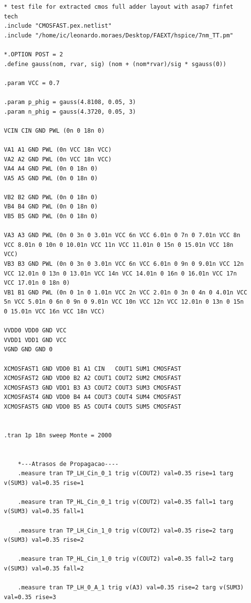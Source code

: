 \documentclass[ecp,tc, english]{iiufrgs}
\begin{document}
\begin{lstlisting}
* test file for extracted cmos full adder layout with asap7 finfet tech
.include "CMOSFAST.pex.netlist"
.include "/home/ic/leonardo.moraes/Desktop/FAEXT/hspice/7nm_TT.pm"

*.OPTION POST = 2
.define gauss(nom, rvar, sig) (nom + (nom*rvar)/sig * sgauss(0))

.param VCC = 0.7

.param p_phig = gauss(4.8108, 0.05, 3)
.param n_phig = gauss(4.3720, 0.05, 3)

VCIN CIN GND PWL (0n 0 18n 0)

VA1 A1 GND PWL (0n VCC 18n VCC)
VA2 A2 GND PWL (0n VCC 18n VCC)
VA4 A4 GND PWL (0n 0 18n 0)
VA5 A5 GND PWL (0n 0 18n 0)

VB2 B2 GND PWL (0n 0 18n 0)
VB4 B4 GND PWL (0n 0 18n 0)
VB5 B5 GND PWL (0n 0 18n 0)

VA3 A3 GND PWL (0n 0 3n 0 3.01n VCC 6n VCC 6.01n 0 7n 0 7.01n VCC 8n VCC 8.01n 0 10n 0 10.01n VCC 11n VCC 11.01n 0 15n 0 15.01n VCC 18n VCC)
VB3 B3 GND PWL (0n 0 3n 0 3.01n VCC 6n VCC 6.01n 0 9n 0 9.01n VCC 12n VCC 12.01n 0 13n 0 13.01n VCC 14n VCC 14.01n 0 16n 0 16.01n VCC 17n VCC 17.01n 0 18n 0)
VB1 B1 GND PWL (0n 0 1n 0 1.01n VCC 2n VCC 2.01n 0 3n 0 4n 0 4.01n VCC 5n VCC 5.01n 0 6n 0 9n 0 9.01n VCC 10n VCC 12n VCC 12.01n 0 13n 0 15n 0 15.01n VCC 16n VCC 18n VCC)

VVDD0 VDD0 GND VCC
VVDD1 VDD1 GND VCC
VGND GND GND 0

XCMOSFAST1 GND VDD0 B1 A1 CIN   COUT1 SUM1 CMOSFAST
XCMOSFAST2 GND VDD0 B2 A2 COUT1 COUT2 SUM2 CMOSFAST
XCMOSFAST3 GND VDD1 B3 A3 COUT2 COUT3 SUM3 CMOSFAST
XCMOSFAST4 GND VDD0 B4 A4 COUT3 COUT4 SUM4 CMOSFAST
XCMOSFAST5 GND VDD0 B5 A5 COUT4 COUT5 SUM5 CMOSFAST


.tran 1p 18n sweep Monte = 2000

    
    *---Atrasos de Propagacao----
    .measure tran TP_LH_Cin_0_1 trig v(COUT2) val=0.35 rise=1 targ v(SUM3) val=0.35 rise=1

    .measure tran TP_HL_Cin_0_1 trig v(COUT2) val=0.35 fall=1 targ v(SUM3) val=0.35 fall=1

    .measure tran TP_LH_Cin_1_0 trig v(COUT2) val=0.35 rise=2 targ v(SUM3) val=0.35 rise=2

    .measure tran TP_HL_Cin_1_0 trig v(COUT2) val=0.35 fall=2 targ v(SUM3) val=0.35 fall=2

    .measure tran TP_LH_0_A_1 trig v(A3) val=0.35 rise=2 targ v(SUM3) val=0.35 rise=3


\end{lstlisting}
\end{document}
